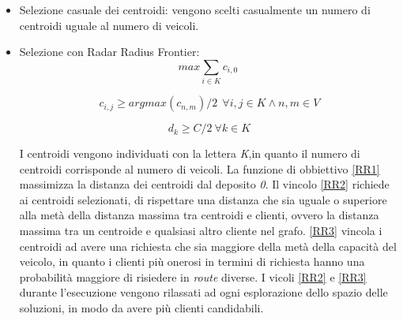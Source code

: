 \documentclass[]{article}
\begin{document}
\begin{itemize}
\item Selezione casuale dei centroidi: vengono scelti casualmente un numero di centroidi uguale al numero di veicoli.
\item Selezione con Radar Radius Frontier: 
\begin{equation}  \label{RR1}
max \sum_{i \in K} c_{i,0} \ 
\end{equation}

\begin{equation} \label{RR2}
c_{i,j} \geq argmax(c_{n,m})/2 \ \ \forall i,j \in K \wedge n,m \in V
\end{equation}



\begin{equation}\label{RR3}
 d_{k} \geq C/2 \ \forall k \in K  
\end{equation}

I centroidi vengono individuati con la lettera \emph{K},in quanto il numero di centroidi corrisponde al numero di veicoli. La funzione di obbiettivo \ref{RR1} massimizza la distanza dei centroidi dal deposito \emph{0}.
Il vincolo \ref{RR2} richiede ai centroidi selezionati, di rispettare una distanza che sia uguale o superiore alla metà della distanza massima tra centroidi e clienti, ovvero la distanza massima tra un centroide e qualsiasi altro cliente nel grafo. \ref{RR3} vincola i centroidi ad avere una richiesta che sia maggiore della metà della capacità del veicolo, in quanto i clienti più onerosi in termini di richiesta hanno una probabilità maggiore di risiedere in \emph{route} diverse.
I vicoli \ref{RR2} e \ref{RR3} durante l'esecuzione vengono rilassati ad ogni esplorazione dello spazio delle soluzioni, in modo da avere più clienti candidabili.



\end{itemize}

\newpage
\end{document}
